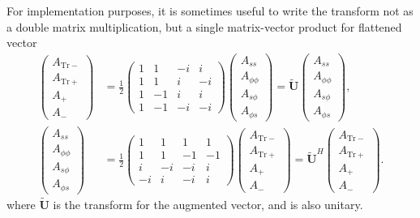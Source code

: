 For implementation purposes, it is sometimes useful to write the transform not as a double matrix multiplication, but a single matrix-vector product for flattened vector
\begin{equation}\label{eqn:linmap-transformed}
\begin{aligned}
    \begin{pmatrix} A_{\mathrm{Tr}-} \\ A_{\mathrm{Tr}+} \\ A_+ \\ A_- \end{pmatrix} &= 
    \frac{1}{2} \begin{pmatrix}
        1 & 1 & -i & i \\
        1 & 1 & i & -i \\
        1 & -1 & i & i \\ 
        1 & -1 & -i & -i
    \end{pmatrix}
    \begin{pmatrix} A_{ss} \\ A_{\phi\phi} \\ A_{s\phi} \\ A_{\phi s} \end{pmatrix} = \widetilde{\mathbf{U}} \begin{pmatrix} A_{ss} \\ A_{\phi\phi} \\ A_{s\phi} \\ A_{\phi s} \end{pmatrix},\\
    \begin{pmatrix} A_{ss} \\ A_{\phi\phi} \\ A_{s\phi} \\ A_{\phi s} \end{pmatrix} &= \frac{1}{2}
    \begin{pmatrix}
        1 & 1 & 1 & 1 \\
        1 & 1 & -1 & -1 \\ 
        i & -i & -i & i \\ 
        -i & i & -i & i
    \end{pmatrix}
    \begin{pmatrix} A_{\mathrm{Tr}-} \\ A_{\mathrm{Tr}+} \\ A_+ \\ A_- \end{pmatrix} = \widetilde{\mathbf{U}}^H \begin{pmatrix} A_{\mathrm{Tr}-} \\ A_{\mathrm{Tr}+} \\ A_+ \\ A_- \end{pmatrix}.
\end{aligned}
\end{equation}
where $\widetilde{\mathbf{U}}$ is the transform for the augmented vector, and is also unitary.
\medskip

